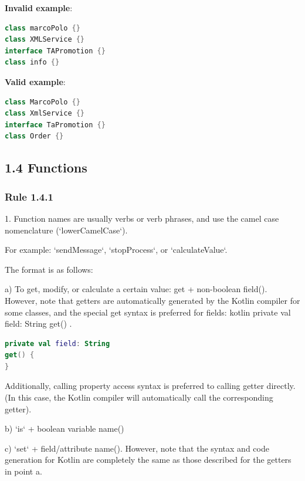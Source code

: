 \textbf{Invalid example}: 

\begin{lstlisting}[language=Kotlin]
class marcoPolo {} 
class XMLService {} 
interface TAPromotion {}
class info {}
\end{lstlisting}


\textbf{Valid example}: 

\begin{lstlisting}[language=Kotlin]
class MarcoPolo {}
class XmlService {}
interface TaPromotion {}
class Order {}
\end{lstlisting}


\subsection*{\textbf{1.4 Functions}}

\subsubsection*{\textbf{Rule 1.4.1}}
\leavevmode\newline



1.	Function names are usually verbs or verb phrases, and use the camel case nomenclature (`lowerCamelCase`).

For example: `sendMessage`, `stopProcess`, or `calculateValue`.

The format is as follows:



a) To get, modify, or calculate a certain value: get + non-boolean field(). However, note that getters are automatically generated by the Kotlin compiler for some classes, and the special get syntax is preferred for fields: kotlin private val field: String get() { }.

\begin{lstlisting}[language=Kotlin]
private val field: String
get() {
}
\end{lstlisting}
Additionally, calling property access syntax is preferred to calling getter directly. (In this case, the Kotlin compiler will automatically call the corresponding getter).



b) `is` + boolean variable name()



c) `set` + field/attribute name(). However, note that the syntax and code generation for Kotlin are completely the same as those described for the getters in point a.



